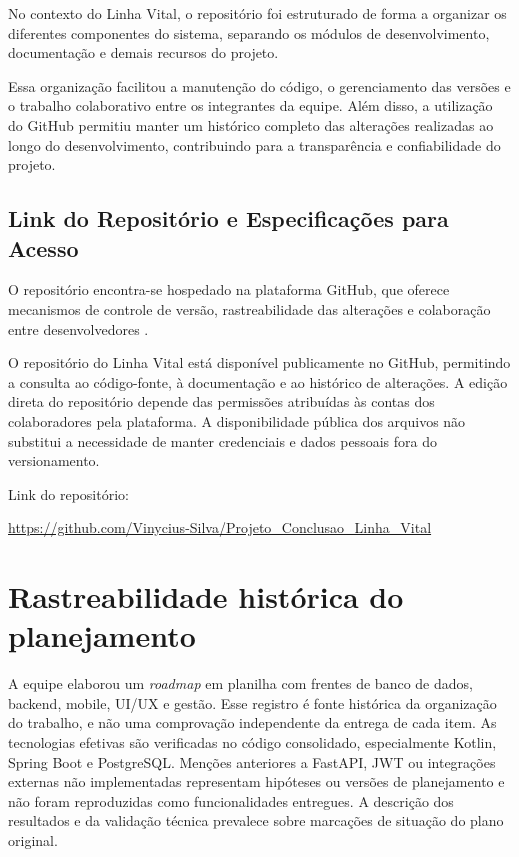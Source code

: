 No contexto do Linha Vital, o repositório foi estruturado de forma a organizar os diferentes componentes do sistema, separando os módulos de desenvolvimento, documentação e demais recursos do projeto.

Essa organização facilitou a manutenção do código, o gerenciamento das versões e o trabalho colaborativo entre os integrantes da equipe. Além disso, a utilização do GitHub permitiu manter um histórico completo das alterações realizadas ao longo do desenvolvimento, contribuindo para a transparência e confiabilidade do projeto.

\subsection{Link do Repositório e Especificações para Acesso}

O repositório encontra-se hospedado na plataforma GitHub, que oferece mecanismos de controle de versão, rastreabilidade das alterações e colaboração entre desenvolvedores \cite{githubdocs2026}.

O repositório do Linha Vital está disponível publicamente no GitHub, permitindo a consulta ao código-fonte, à documentação e ao histórico de alterações. A edição direta do repositório depende das permissões atribuídas às contas dos colaboradores pela plataforma. A disponibilidade pública dos arquivos não substitui a necessidade de manter credenciais e dados pessoais fora do versionamento.

Link do repositório:

\begin{center}
\url{https://github.com/Vinycius-Silva/Projeto_Conclusao_Linha_Vital}
\end{center}


\section{Rastreabilidade histórica do planejamento}

A equipe elaborou um \emph{roadmap} em planilha com frentes de banco de dados, backend, mobile, UI/UX e gestão. Esse registro é fonte histórica da organização do trabalho, e não uma comprovação independente da entrega de cada item. As tecnologias efetivas são verificadas no código consolidado, especialmente Kotlin, Spring Boot e PostgreSQL. Menções anteriores a FastAPI, JWT ou integrações externas não implementadas representam hipóteses ou versões de planejamento e não foram reproduzidas como funcionalidades entregues. A descrição dos resultados e da validação técnica prevalece sobre marcações de situação do plano original.
